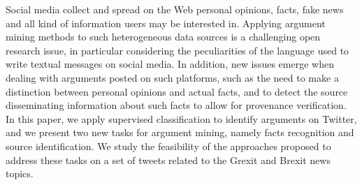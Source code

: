 Social media collect and spread on the Web personal opinions, facts, fake news and all kind of information users may be interested in. Applying argument mining methods to such heterogeneous data sources is a challenging open research issue, in particular considering the peculiarities of the language used to write textual messages on social media. In addition, new issues emerge when dealing with arguments posted on such platforms, such as the need to make a distinction between personal opinions and actual facts, and to detect the source disseminating information about such facts to allow for provenance verification. In this paper, we apply supervised classification to identify arguments on Twitter, and we present two new tasks for argument mining, namely facts recognition and source identification. We study the feasibility of the approaches proposed to address these tasks on a set of tweets related to the Grexit and Brexit news topics.

